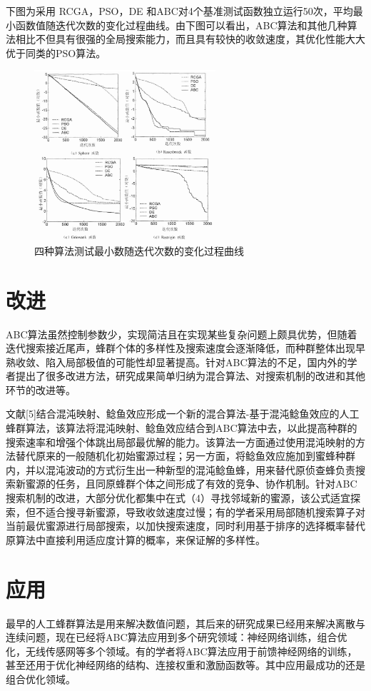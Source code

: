 \documentclass[a4paper,12pt]{report}
\begin{document}
\begin{spacing}{1.5}
下图为采用 RCGA，PSO，DE 和ABC对4个基准测试函数独立运行50次，平均最小函数值随迭代次数的变化过程曲线。由下图可以看出，ABC算法和其他几种算法相比不但具有很强的全局搜索能力，而且具有较快的收敛速度，其优化性能大大优于同类的PSO算法。
		\begin{figure}[htbp]
			\centering
			\includegraphics[width=0.6\textwidth]{pic/bee11.png}
			\caption{四种算法测试最小数随迭代次数的变化过程曲线}
			\label{fig:pt4}
		\end{figure}

\section{改进}
	ABC算法虽然控制参数少，实现简洁且在实现某些复杂问题上颇具优势，但随着迭代搜索接近尾声，蜂群个体的多样性及搜索速度会逐渐降低，而种群整体出现早熟收敛、陷入局部极值的可能性却显著提高。针对ABC算法的不足，国内外的学者提出了很多改进方法，研究成果简单归纳为混合算法、对搜索机制的改进和其他环节的改进等。

	文献[5]结合混沌映射、鲶鱼效应形成一个新的混合算法-基于混沌鲶鱼效应的人工蜂群算法，该算法将混沌映射、鲶鱼效应结合到ABC算法中去，以此提高种群的搜索速率和增强个体跳出局部最优解的能力。该算法一方面通过使用混沌映射的方法替代原来的一般随机化初始蜜源过程；另一方面，将鲶鱼效应施加到蜜蜂种群内，并以混沌波动的方式衍生出一种新型的混沌鲶鱼蜂，用来替代原侦查蜂负责搜索新蜜源的任务，且同原蜂群个体之间形成了有效的竞争、协作机制。针对ABC搜索机制的改进，大部分优化都集中在式（4）寻找邻域新的蜜源，该公式适宜探索，但不适合搜寻新蜜源，导致收敛速度过慢；有的学者采用局部随机搜索算子对当前最优蜜源进行局部搜索，以加快搜索速度，同时利用基于排序的选择概率替代原算法中直接利用适应度计算的概率，来保证解的多样性。

\section{应用}
	最早的人工蜂群算法是用来解决数值问题，其后来的研究成果已经用来解决离散与连续问题，现在已经将ABC算法应用到多个研究领域：神经网络训练，组合优化，无线传感网等多个领域。有的学者将ABC算法应用于前馈神经网络的训练，甚至还用于优化神经网络的结构、连接权重和激励函数等。其中应用最成功的还是组合优化领域。


\end{spacing}
\end{document}
